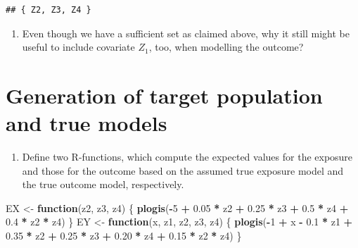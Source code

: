 \documentclass[
]{book}
\newenvironment{Shaded}{\begin{snugshade}}{\end{snugshade}}
\newcommand{\ControlFlowTok}[1]{\textcolor[rgb]{0.13,0.29,0.53}{\textbf{#1}}}
\newcommand{\DecValTok}[1]{\textcolor[rgb]{0.00,0.00,0.81}{#1}}
\newcommand{\FloatTok}[1]{\textcolor[rgb]{0.00,0.00,0.81}{#1}}
\newcommand{\FunctionTok}[1]{\textcolor[rgb]{0.13,0.29,0.53}{\textbf{#1}}}
\newcommand{\NormalTok}[1]{#1}
\newcommand{\OtherTok}[1]{\textcolor[rgb]{0.56,0.35,0.01}{#1}}
\newcommand{\SpecialCharTok}[1]{\textcolor[rgb]{0.81,0.36,0.00}{\textbf{#1}}}
\providecommand{\tightlist}{%
  \setlength{\itemsep}{0pt}\setlength{\parskip}{0pt}}
\theoremstyle{definition}
\theoremstyle{definition}
\theoremstyle{definition}
\theoremstyle{definition}
\theoremstyle{remark}
\begin{document}
\begin{verbatim}
## { Z2, Z3, Z4 }
\end{verbatim}

\begin{enumerate}
\def\labelenumi{\arabic{enumi}.}
\setcounter{enumi}{2}
\tightlist
\item
  Even though we have a sufficient set as claimed above, why it still
  might be useful to include covariate \(Z_1\), too, when modelling the
  outcome?
\end{enumerate}

\section{Generation of target population and true models}\label{generation-of-target-population-and-true-models}

\begin{enumerate}
\def\labelenumi{\arabic{enumi}.}
\tightlist
\item
  Define two R-functions, which compute the expected values for the
  exposure and those for the outcome based on the assumed true
  exposure model and the true outcome model, respectively.
\end{enumerate}

\begin{Shaded}
\begin{Highlighting}[]
\NormalTok{EX }\OtherTok{\textless{}{-}} \ControlFlowTok{function}\NormalTok{(z2, z3, z4) \{}
  \FunctionTok{plogis}\NormalTok{(}\SpecialCharTok{{-}}\DecValTok{5} \SpecialCharTok{+} \FloatTok{0.05} \SpecialCharTok{*}\NormalTok{ z2 }\SpecialCharTok{+} \FloatTok{0.25} \SpecialCharTok{*}\NormalTok{ z3 }\SpecialCharTok{+} \FloatTok{0.5} \SpecialCharTok{*}\NormalTok{ z4 }\SpecialCharTok{+} \FloatTok{0.4} \SpecialCharTok{*}\NormalTok{ z2 }\SpecialCharTok{*}\NormalTok{ z4)}
\NormalTok{\}}
\NormalTok{EY }\OtherTok{\textless{}{-}} \ControlFlowTok{function}\NormalTok{(x, z1, z2, z3, z4) \{}
  \FunctionTok{plogis}\NormalTok{(}\SpecialCharTok{{-}}\DecValTok{1} \SpecialCharTok{+}\NormalTok{ x }\SpecialCharTok{{-}} \FloatTok{0.1} \SpecialCharTok{*}\NormalTok{ z1 }\SpecialCharTok{+} \FloatTok{0.35} \SpecialCharTok{*}\NormalTok{ z2 }\SpecialCharTok{+} \FloatTok{0.25} \SpecialCharTok{*}\NormalTok{ z3 }\SpecialCharTok{+}
    \FloatTok{0.20} \SpecialCharTok{*}\NormalTok{ z4 }\SpecialCharTok{+} \FloatTok{0.15} \SpecialCharTok{*}\NormalTok{ z2 }\SpecialCharTok{*}\NormalTok{ z4)}
\NormalTok{\}}
\end{Highlighting}
\end{Shaded}
\end{document}
